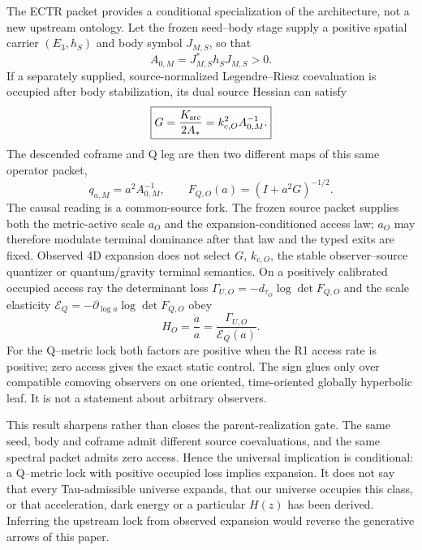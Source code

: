 \documentclass[11pt]{article}
\begin{document}
The ECTR packet provides a conditional specialization of the architecture,
not a new upstream ontology.  Let the frozen seed--body stage supply a
positive spatial carrier $(E_3,h_S)$ and body symbol $J_{M,S}$, so that
\begin{equation}
 A_{0,M}=J_{M,S}^*h_SJ_{M,S}>0.
 \label{eq:paperi-ectr-a0}
\end{equation}
If a separately supplied, source-normalized Legendre--Riesz coevaluation is
occupied after body stabilization, its dual source Hessian can satisfy
\begin{equation}
 \boxed{G=\frac{K_{\rm src}}{2A_*}=k_{c,O}^2A_{0,M}^{-1}.}
 \label{eq:paperi-ectr-lock}
\end{equation}
The descended coframe and Q leg are then two different maps of this same
operator packet,
\begin{equation}
 q_{a,M}=a^2A_{0,M}^{-1},
 \qquad F_{Q,O}(a)=(I+a^2G)^{-1/2}.
 \label{eq:paperi-ectr-descendants}
\end{equation}
The causal reading is a common-source fork.  The frozen source packet supplies
both the metric-active scale $a_O$ and the expansion-conditioned access law;
$a_O$ may therefore modulate terminal dominance after that law and the typed
exits are fixed.  Observed 4D expansion does not select $G$, $k_{c,O}$, the
stable observer--source quantizer or quantum/gravity terminal semantics.
On a positively calibrated occupied access ray the determinant loss
$\Gamma_{U,O}=-d_{\tau_O}\log\det F_{Q,O}$ and the scale elasticity
$\mathcal E_Q=-\partial_{\log a}\log\det F_{Q,O}$ obey
\begin{equation}
 \boxed{H_O=\frac{\dot a}{a}=\frac{\Gamma_{U,O}}{\mathcal E_Q(a)}}.
 \label{eq:paperi-ectr-classifier}
\end{equation}
For the Q--metric lock both factors are positive when the R1 access rate is
positive; zero access gives the exact static control.  The sign glues only
over compatible comoving observers on one oriented, time-oriented globally
hyperbolic leaf.  It is not a statement about arbitrary observers.

This result sharpens rather than closes the parent-realization gate.  The
same seed, body and coframe admit different source coevaluations, and the same
spectral packet admits zero access.  Hence the universal implication is
conditional: a Q--metric lock with positive occupied loss implies expansion.
It does not say that every Tau-admissible universe expands, that our universe
occupies this class, or that acceleration, dark energy or a particular
$H(z)$ has been derived.  Inferring the upstream lock from observed expansion
would reverse the generative arrows of this paper.
\end{document}
